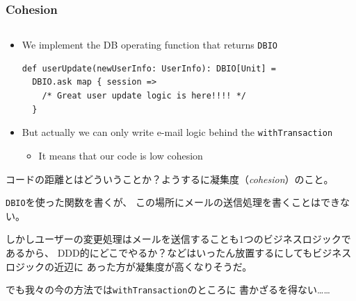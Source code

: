 \begin{frame}[fragile]
  \frametitle{Cohesion}

  \begin{columns}
    \begin{column}{0.5\textwidth}
    \end{column}
    \begin{column}{0.5\textwidth}
    \end{column}
  \end{columns}

  \pause
  \begin{itemize}
    \item We implement the DB operating function that returns \lstinline|DBIO|

\begin{lstlisting}[style=scala]
def userUpdate(newUserInfo: UserInfo): DBIO[Unit] =
  DBIO.ask map { session =>
    /* Great user update logic is here!!!! */
  }
\end{lstlisting}
  \end{itemize}

  \pause

  \pause
  \begin{itemize}
    \item But actually we can only write e-mail logic
    behind the \lstinline|withTransaction| 
    \begin{itemize}
      \item It means that our code is low cohesion
    \end{itemize}
  \end{itemize}

  \begin{notes}
    \item コードの距離とはどういうことか？ようするに凝集度（\emph{cohesion}）のこと。

    \item \lstinline|DBIO|を使った関数を書くが、
    この場所にメールの送信処理を書くことはできない。

    \item しかしユーザーの変更処理はメールを送信することも1つのビジネスロジックであるから、
    DDD的にどこでやるか？などはいったん放置するにしてもビジネスロジックの近辺に
    あった方が凝集度が高くなりそうだ。

    \item でも我々の今の方法では\lstinline|withTransaction|のところに
    書かざるを得ない……
  \end{notes}
\end{frame}


